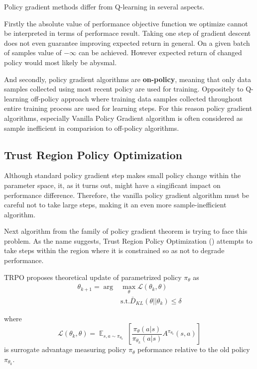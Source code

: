 Policy gradient methods differ from Q-learning in several aspects.

Firstly the absolute value of performance objective function we optimize cannot be interpreted in terms of performace result.
Taking one step of gradient descent does not even guarantee improving expected return in general.
On a given batch of samples value of $-\infty$ can be achieved. 
However expected return of changed policy would most likely be abysmal.

And secondly, policy gradient algorithms are \textbf{on-policy}, meaning that only data samples collected using most recent policy are used for training.
Oppositely to Q-learning off-policy approach where training data samples collected throughout entire training process are used for learning steps.
For this reason policy gradient algorithms, especially Vanilla Policy Gradient algorithm is often considered as sample inefficient in comparision to off-policy algorithms.


\subsection{Trust Region Policy Optimization}
Although standard policy gradient step makes small policy change within the parameter space, it, as it turns out, might have a singificant impact on performance difference.
Therefore, the vanilla policy gradient algorithm must be careful not to take large steps, making it an even more sample-inefficient algorithm.

Next algorithm from the family of policy gradient theorem is trying to face this problem.
As the name suggests, Trust Region Policy Optimization (\cite{TRPO}) attempts to take steps within the region where it is constrained so as not to degrade performance.

TRPO proposes theoretical update of parametrized policy $\pi_\theta$ as 
\begin{align*}
  \theta_{k+1} = \arg &\max_\theta \mathcal{L}(\theta_k,\theta)   \\  
  &\text{s.t.}  \bar{D}_{KL}(\theta||\theta_k) \leq \delta
\end{align*}

where \[\mathcal{L}(\theta_k,\theta) = \mathop{\mathbb{E}}_{s,a \sim \pi_{\theta_k}} \ \left[ \frac{\pi_\theta(a|s)}{\pi_{\theta_k}(a|s)}A^{\pi_{\theta_k}} (s,a) \right] \]
is surrogate advantage measuring policy $\pi_\theta$ peformance relative to the old policy $\pi_{\theta_k}$.

